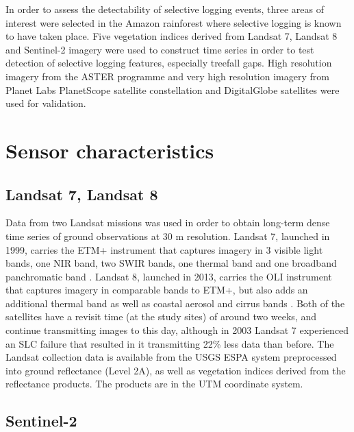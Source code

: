 \documentclass[a4paper,12pt]{scrbook}
\begin{document}
In order to assess the detectability of selective logging events, three areas of interest were selected in the Amazon rainforest where selective logging is known to have taken place. Five vegetation indices derived from Landsat 7, Landsat 8 and Sentinel-2 imagery were used to construct time series in order to test detection of selective logging features, especially treefall gaps. High resolution imagery from the \ac{ASTER} programme and very high resolution imagery from Planet Labs PlanetScope satellite constellation and DigitalGlobe satellites were used for validation.

\section{Sensor characteristics}

\subsection{Landsat 7, Landsat 8}

Data from two Landsat missions was used in order to obtain long-term dense time series of ground observations at 30 m resolution. Landsat 7, launched in 1999, carries the \ac{ETM+} instrument that captures imagery in 3 visible light bands, one \ac{NIR} band, two \ac{SWIR} bands, one thermal band and one broadband panchromatic band \citep{u.s._geological_survey_product_2017_2}. Landsat 8, launched in 2013, carries the \ac{OLI} instrument that captures imagery in comparable bands to \ac{ETM+}, but also adds an additional thermal band as well as coastal aerosol and cirrus bands \citep{u.s._geological_survey_product_2017}. Both of the satellites have a revisit time (at the study sites) of around two weeks, and continue transmitting images to this day, although in 2003 Landsat 7 experienced an \ac{SLC} failure that resulted in it transmitting 22\% less data than before. The Landsat collection data is available from the \ac{USGS} \ac{ESPA} system preprocessed into ground reflectance (Level 2A), as well as vegetation indices derived from the reflectance products. The products are in the \ac{UTM} coordinate system.

\subsection{Sentinel-2}
\end{document}
